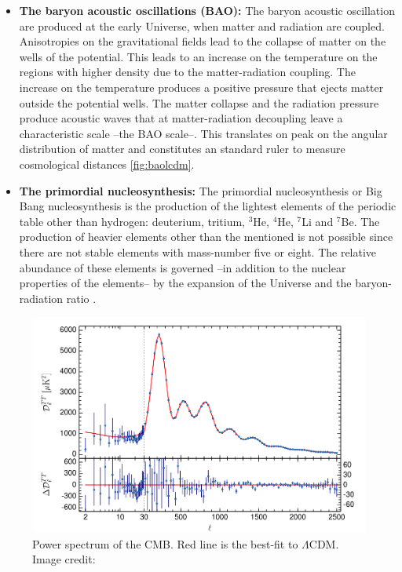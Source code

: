 \begin{itemize}
\item {\bf The baryon acoustic oscillations (BAO):} The baryon acoustic oscillation are produced at the early Universe, when matter and radiation are coupled. Anisotropies on the gravitational fields lead to the collapse of matter on the wells of the potential. This leads to an increase on the temperature on the regions with higher density due to the matter-radiation coupling. The increase on the temperature produces a positive pressure that ejects matter outside the potential wells. The matter collapse and the radiation pressure produce acoustic waves that at matter-radiation decoupling leave a characteristic scale --the BAO scale--. This translates on peak on the angular distribution of matter and constitutes an standard ruler to measure cosmological distances \autoref{fig:baolcdm}.

\item {\bf The primordial nucleosynthesis:} The primordial nucleosynthesis or Big Bang nucleosynthesis is the production of the lightest elements of the periodic table other than hydrogen: deuterium, tritium, $^3$He, $^4$He, $^7$Li and $^7$Be. The production of heavier elements other than the mentioned is not possible since there are not stable elements with mass-number five or eight. The relative abundance of these elements is governed --in addition to the nuclear properties of the elements-- by the expansion of the Universe and the baryon-radiation ratio \cite{2006IJMPE..15....1S}.
\end{itemize}

\begin{figure}
\includegraphics[width=\textwidth]{./Pictures/CMB_pk.png}
\caption{Power spectrum of the CMB. Red line is the best-fit to $\Lambda$CDM. Image credit: \cite{2015arXiv150201589P}}
\label{fig:cmbpk}
\end{figure}

